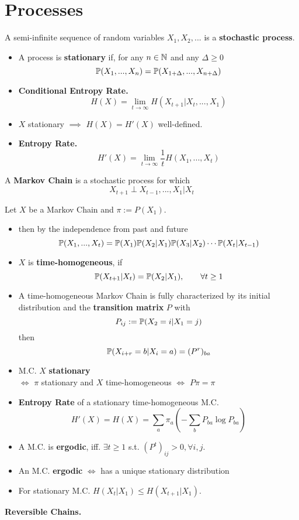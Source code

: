 \section{Processes}

A semi-infinite sequence of random variables \(X_1, X_2, ... \) is a \textbf{stochastic process}.

\begin{itemize}[label=-]
    \item A process is \textbf{stationary} if, for any \(n \in \N\) and any \(\Delta \geq 0\) 
    \[\P(X_1, ..., X_n) = \P(X_{1+\Delta}, ..., X_{n+\Delta})\] 
    \item \textbf{Conditional Entropy Rate.} 
    \[H(X) = \lim_{t \to \infty} H(X_{t+1} | X_t, ..., X_1)\]
    \item \(X\) stationary \(\implies\) \(H(X) = H'(X)\) well-defined.
    \item \textbf{Entropy Rate.} \[H'(X) = \lim_{t \to \infty} \frac{1}{t}H(X_1, ..., X_t)\] 
\end{itemize}

A \textbf{Markov Chain} is a stochastic process for which 
\[X_{t+1} \perp X_{t-1}, ..., X_1 | X_t\]

Let \(X\) be a Markov Chain and \(\pi := P(X_1)\).
\begin{itemize}[label=-]
    \item then by the independence from past and future
    \[\P(X_1, ..., X_t) = \P(X_1)\P(X_2|X_1)\P(X_3|X_2)\cdots \P(X_t | X_{t-1})\]
    \item \(X\) is \textbf{time-homogeneous}, if \[\P(X_{t+1}|X_t) = \P(X_2|X_1), \qquad \forall t \geq 1\]
    \item A time-homogeneous Markov Chain is fully characterized by its initial distribution and the \textbf{transition matrix} \(P\) with 
    \[P_{ij} := \P(X_2 = i | X_1 = j)\] 
    then \[\P(X_{i+r} = b | X_i = a) = (P^r)_{ba}\]
    \item M.C. \(X\) \textbf{stationary} \\\(\iff\) \(\pi\) stationary and \(X\) time-homogeneous \(\iff\) \(P \pi = \pi\)
    \item\textbf{Entropy Rate} of a stationary time-homogeneous M.C. 
    \[H'(X) = H(X) = \sum_{a}\pi_a \left(- \sum_{b}P_{ba} \log P_{ba}\right)\]
    \item A M.C. is \textbf{ergodic}, iff. \(\exists t \geq 1\) s.t. \((P^t)_{ij} > 0, \forall i, j.\)
    \item An M.C. \textbf{ergodic} \(\iff\) has a unique stationary distribution
    \item For stationary M.C. \(H(X_t | X_1) \leq H(X_{t+1}|X_1)\).
\end{itemize}
\textbf{Reversible Chains.}

